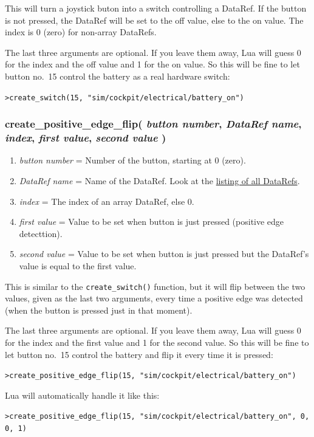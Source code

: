 \documentclass[11pt,parskip=half,a4paper]{scrartcl}
\begin{document}
This will turn a joystick buton into a switch controlling a DataRef. If the button is not pressed, the DataRef will be set to the off value, else to the on value. The index is 0 (zero) for non-array DataRefs.

The last three arguments are optional. If you leave them away, Lua will guess 0 for the index and the off value and 1 for the on value. So this will be fine to let button no.~15 control the battery as a real hardware switch:

\verb|>create_switch(15, "sim/cockpit/electrical/battery_on")|

\subsubsection{create\_positive\_edge\_flip( \emph{button number}, \emph{DataRef name}, \emph{index}, \emph{first value}, \emph{second value} )}

\begin{enumerate}
	\item \emph{button number} = Number of the button, starting at 0 (zero).
	\item \emph{DataRef name} = Name of the DataRef. Look at the \href{http://www.xsquawkbox.net/xpsdk/docs/DataRefs.html}{listing of all DataRefs}.
	\item \emph{index} = The index of an array DataRef, else 0.
	\item \emph{first value} = Value to be set when button is just pressed (positive edge detecttion).
	\item \emph{second value} = Value to be set when button is just pressed but the DataRef's value is equal to the first value.
\end{enumerate}

This is similar to the \verb|create_switch()| function, but it will flip between the two values, given as the last two arguments, every time a positive edge was detected (when the button is pressed just in that moment).

The last three arguments are optional. If you leave them away, Lua will guess 0 for the index and the first value and 1 for the second value. So this will be fine to let button no.~15 control the battery and flip it every time it is pressed:

\verb|>create_positive_edge_flip(15, "sim/cockpit/electrical/battery_on")|

Lua will automatically handle it like this:

\verb|>create_positive_edge_flip(15, "sim/cockpit/electrical/battery_on", 0, 0, 1)|
\end{document}
